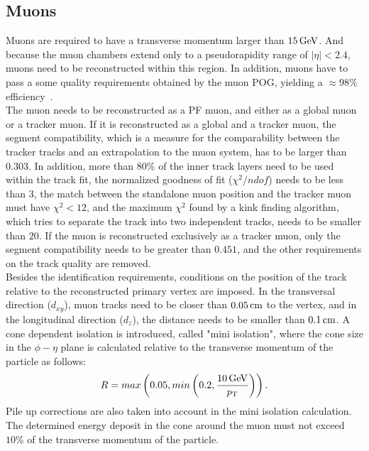 \subsection{Muons}
Muons are required to have a transverse momentum larger than $15\,\text{Ge\hspace{-.08em}V}$. And because the muon chambers extend only to a pseudorapidity range of $|\eta|<2.4$, muons need to be reconstructed within this region. In addition, muons have to pass a some quality requirements obtained by the muon POG, yielding a $\approx 98\%$ efficiency~\cite{MuonIDPerf}.\\
The muon needs to be reconstructed as a PF muon, and either as a global muon or a tracker muon. If it is reconstructed as a global and a tracker muon, the segment compatibility, which is a measure for the comparability between the tracker tracks and an extrapolation to the muon system, has to be larger than $0.303$. In addition, more than $80\%$ of the inner track layers need to be used within the track fit, the normalized goodness of fit ($\chi^2/ndof$) needs to be less than $3$, the match between the standalone muon position and the tracker muon must have $\chi^2<12$, and the maximum $\chi^2$ found by a kink finding algorithm, which tries to separate the track into two independent tracks, needs to be smaller than $20$. If the muon is reconstructed exclusively as a tracker muon, only the segment compatibility needs to be greater than $0.451$, and the other requirements on the track quality are removed.\\
Besides the identification requirements, conditions on the position of the track relative to the reconstructed primary vertex are imposed. In the transversal direction ($d_{xy}$), muon tracks need to be closer than $0.05\,\text{cm}$ to the vertex, and in the longitudinal direction ($d_z$), the distance needs to be smaller than $0.1\,\text{cm}$. A cone dependent isolation is introduced, called "mini isolation", where the cone size in the $\phi-\eta$ plane is calculated relative to the transverse momentum of the particle as follows:
\begin{equation}
 R = max\left(0.05,min\left(0.2,\frac{10\,\text{Ge\hspace{-.08em}V}}{p_{\mathrm{T}}}\right)\right).
\end{equation}
Pile up corrections are also taken into account in the mini isolation calculation.
The determined energy deposit in the cone around the muon must not exceed $10\%$ of the transverse momentum of the particle.


